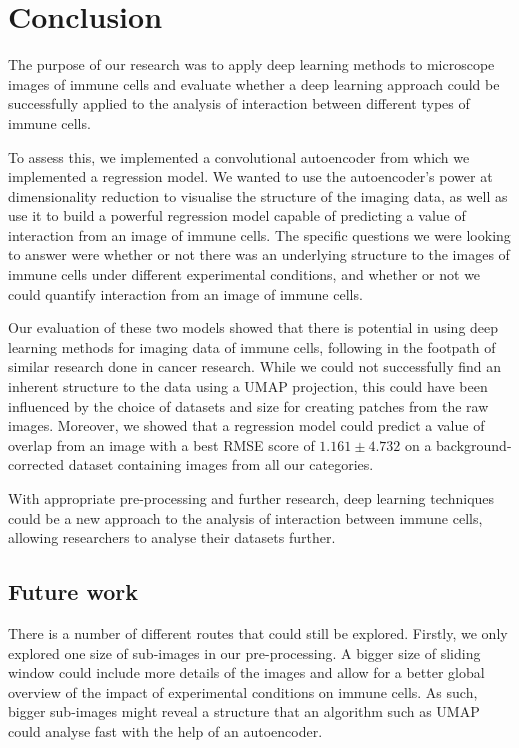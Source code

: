 \chapter{Conclusion}    

The purpose of our research was to apply deep learning methods to microscope images of immune cells and evaluate whether a deep learning approach could be successfully applied to the analysis of interaction between different types of immune cells. 

To assess this, we implemented a convolutional autoencoder from which we implemented a regression model. We wanted to use the autoencoder's power at dimensionality reduction to visualise the structure of the imaging data, as well as use it to build a powerful regression model capable of predicting a value of interaction from an image of immune cells. The specific questions we were looking to answer were whether or not there was an underlying structure to the images of immune cells under different experimental conditions, and whether or not we could quantify interaction from an image of immune cells.

Our evaluation of these two models showed that there is potential in using deep learning methods for imaging data of immune cells, following in the footpath of similar research done in cancer research. While we could not successfully find an inherent structure to the data using a UMAP projection, this could have been influenced by the choice of datasets and size for creating patches from the raw images. Moreover, we showed that a regression model could predict a value of overlap from an image with a best RMSE score of $1.161 \pm 4.732$ on a background-corrected dataset containing images from all our categories. 

With appropriate pre-processing and further research, deep learning techniques could be a new approach to the analysis of interaction between immune cells, allowing researchers to analyse their datasets further.

\section{Future work}

There is a number of different routes that could still be explored. Firstly, we only explored one size of sub-images in our pre-processing. A bigger size of sliding window could include more details of the images and allow for a better global overview of the impact of experimental conditions on immune cells. As such, bigger sub-images might reveal a structure that an algorithm such as UMAP could analyse fast with the help of an autoencoder.


